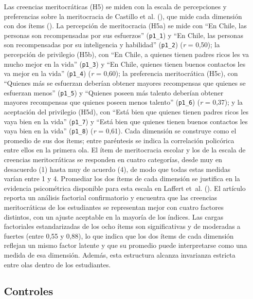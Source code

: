 \documentclass[
  spanish,
  a4paper,
  oneside]{scrbook}
\begin{document}
Las creencias meritocráticas (H5) se miden con la escala de percepciones
y preferencias sobre la meritocracia de Castillo et al.
(), que mide cada
dimensión con dos ítems (). La percepción de meritocracia (H5a) se mide con ``En Chile, las
personas son recompensadas por sus esfuerzos'' (\texttt{p1\_1}) y ``En
Chile, las personas son recompensadas por su inteligencia y habilidad''
(\texttt{p1\_2}) (\emph{r} = 0,50); la percepción de privilegio (H5b),
con ``En Chile, a quienes tienen padres ricos les va mucho mejor en la
vida'' (\texttt{p1\_3}) y ``En Chile, quienes tienen buenos contactos
les va mejor en la vida'' (\texttt{p1\_4}) (\emph{r} = 0,60); la
preferencia meritocrática (H5c), con ``Quienes más se esfuerzan deberían
obtener mayores recompensas que quienes se esfuerzan menos''
(\texttt{p1\_5}) y ``Quienes poseen más talento deberían obtener mayores
recompensas que quienes poseen menos talento'' (\texttt{p1\_6})
(\emph{r} = 0,37); y la aceptación del privilegio (H5d), con ``Está bien
que quienes tienen padres ricos les vaya bien en la vida''
(\texttt{p1\_7}) y ``Está bien que quienes tienen buenos contactos les
vaya bien en la vida'' (\texttt{p1\_8}) (\emph{r} = 0,61). Cada
dimensión se construye como el promedio de sus dos ítems; entre
paréntesis se indica la correlación policórica entre ellos en la primera
ola. El ítem de meritocracia escolar y los de la escala de creencias
meritocráticas se responden en cuatro categorías, desde muy en
desacuerdo (1) hasta muy de acuerdo (4), de modo que todas estas medidas
varían entre 1 y 4. Promediar los dos ítems de cada dimensión se
justifica en la evidencia psicométrica disponible para esta escala en
Laffert et~al. (). El artículo
reporta un análisis factorial confirmatorio y encuentra que las
creencias meritocráticas de los estudiantes se representan mejor con
cuatro factores distintos, con un ajuste aceptable en la mayoría de los
índices. Las cargas factoriales estandarizadas de los ocho ítems son
significativas y de moderadas a fuertes (entre 0,55 y 0,88), lo que
indica que los dos ítems de cada dimensión reflejan un mismo factor
latente y que su promedio puede interpretarse como una medida de esa
dimensión. Además, esta estructura alcanza invarianza estricta entre
olas dentro de los estudiantes.

\subsection{Controles}\label{controles}
\end{document}
